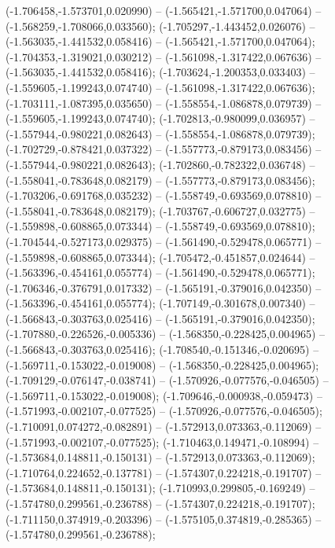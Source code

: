  (-1.706458,-1.573701,0.020990) -- (-1.565421,-1.571700,0.047064) -- (-1.568259,-1.708066,0.033560);
 (-1.705297,-1.443452,0.026076) -- (-1.563035,-1.441532,0.058416) -- (-1.565421,-1.571700,0.047064);
 (-1.704353,-1.319021,0.030212) -- (-1.561098,-1.317422,0.067636) -- (-1.563035,-1.441532,0.058416);
 (-1.703624,-1.200353,0.033403) -- (-1.559605,-1.199243,0.074740) -- (-1.561098,-1.317422,0.067636);
 (-1.703111,-1.087395,0.035650) -- (-1.558554,-1.086878,0.079739) -- (-1.559605,-1.199243,0.074740);
 (-1.702813,-0.980099,0.036957) -- (-1.557944,-0.980221,0.082643) -- (-1.558554,-1.086878,0.079739);
 (-1.702729,-0.878421,0.037322) -- (-1.557773,-0.879173,0.083456) -- (-1.557944,-0.980221,0.082643);
 (-1.702860,-0.782322,0.036748) -- (-1.558041,-0.783648,0.082179) -- (-1.557773,-0.879173,0.083456);
 (-1.703206,-0.691768,0.035232) -- (-1.558749,-0.693569,0.078810) -- (-1.558041,-0.783648,0.082179);
 (-1.703767,-0.606727,0.032775) -- (-1.559898,-0.608865,0.073344) -- (-1.558749,-0.693569,0.078810);
 (-1.704544,-0.527173,0.029375) -- (-1.561490,-0.529478,0.065771) -- (-1.559898,-0.608865,0.073344);
 (-1.705472,-0.451857,0.024644) -- (-1.563396,-0.454161,0.055774) -- (-1.561490,-0.529478,0.065771);
 (-1.706346,-0.376791,0.017332) -- (-1.565191,-0.379016,0.042350) -- (-1.563396,-0.454161,0.055774);
 (-1.707149,-0.301678,0.007340) -- (-1.566843,-0.303763,0.025416) -- (-1.565191,-0.379016,0.042350);
 (-1.707880,-0.226526,-0.005336) -- (-1.568350,-0.228425,0.004965) -- (-1.566843,-0.303763,0.025416);
 (-1.708540,-0.151346,-0.020695) -- (-1.569711,-0.153022,-0.019008) -- (-1.568350,-0.228425,0.004965);
 (-1.709129,-0.076147,-0.038741) -- (-1.570926,-0.077576,-0.046505) -- (-1.569711,-0.153022,-0.019008);
 (-1.709646,-0.000938,-0.059473) -- (-1.571993,-0.002107,-0.077525) -- (-1.570926,-0.077576,-0.046505);
 (-1.710091,0.074272,-0.082891) -- (-1.572913,0.073363,-0.112069) -- (-1.571993,-0.002107,-0.077525);
 (-1.710463,0.149471,-0.108994) -- (-1.573684,0.148811,-0.150131) -- (-1.572913,0.073363,-0.112069);
 (-1.710764,0.224652,-0.137781) -- (-1.574307,0.224218,-0.191707) -- (-1.573684,0.148811,-0.150131);
 (-1.710993,0.299805,-0.169249) -- (-1.574780,0.299561,-0.236788) -- (-1.574307,0.224218,-0.191707);
 (-1.711150,0.374919,-0.203396) -- (-1.575105,0.374819,-0.285365) -- (-1.574780,0.299561,-0.236788);

